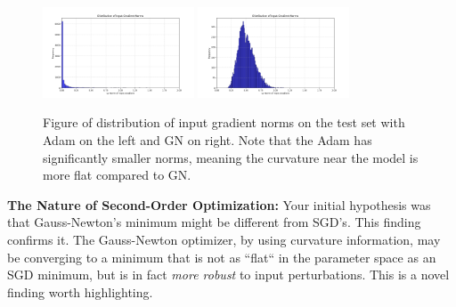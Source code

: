 \documentclass{article}
\begin{document}
    \begin{figure}
        \centering
        \includegraphics[width=0.4\textwidth]{../src/outputs/2025-09-10/23-05-38/input_gradient_norm_distribution.png}
        \includegraphics[width=0.4\textwidth]{../src/outputs/2025-09-10/23-05-59/input_gradient_norm_distribution.png}
        \caption{Figure of distribution of input gradient norms on the test set with Adam on the left and GN on right.
        Note that the Adam has significantly smaller norms, meaning the curvature near the model is more flat compared to GN.}
        \label{fig:grad-norm}
    \end{figure}

    \textbf{The Nature of Second-Order Optimization:}
    Your initial hypothesis was that Gauss-Newton's minimum might be different from SGD's.
    This finding confirms it. The Gauss-Newton optimizer, by using curvature information, may be converging to a minimum that is not as ``flat`` in the parameter space as an SGD minimum, but is in fact \textit{more robust} to input perturbations.
    This is a novel finding worth highlighting.
\end{document}
